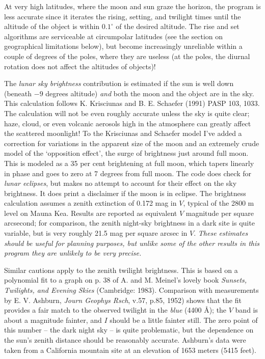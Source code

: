 At very high latitudes, where the moon and sun graze the horizon, the 
program is less accurate since it iterates the rising, setting, and twilight 
times until the altitude of the object is within $0.1^{\circ}$ of the 
desired altitude. The rise and set algorithms are serviceable at circumpolar 
latitudes (see the section on geographical limitations below), but become
increasingly unreliable within a couple of degrees of the poles, where they 
are useless (at the poles, the diurnal rotation does not affect the altitudes 
of objects)!

The {\it lunar sky brightness} contribution is estimated if the sun is well 
down (beneath $-9$ degrees altitude) {\it and} both the moon and the object 
are in the sky.  This calculation follows K. Krisciunas and B. E. Schaefer 
(1991) PASP 103, 1033.  The calculation will not be even roughly accurate 
unless the sky is quite clear; haze, cloud, or even volcanic aerosols high
in the atmosphere can greatly affect the scattered moonlight!  To the 
Krisciunas and Schaefer model I've added a correction for variations in the 
apparent size of the moon and an extremely crude model of the `opposition 
effect', the surge of brightness just around full moon. This is modeled as a 
35 per cent brightening at full moon, which tapers linearly in phase and 
goes to zero at 7 degrees from full moon.  The code does check for 
{\it lunar eclipses}, but makes no attempt to account for their effect on 
the sky brightness.  It does print a disclaimer if the moon is in eclipse.
The brightness calculation assumes a zenith extinction of 0.172 mag in $V$,
typical of the 2800 m level on Mauna Kea.  Results are reported
as equivalent $V$ magnitude per square arcsecond; for comparison, 
the zenith night-sky brightness in a dark site is quite variable, but
is very roughly 21.5 mag per square arcsec in $V$.  
{\it These estimates should be useful for planning purposes, but unlike some 
of the other results in this program they are unlikely to be very precise.}

Similar cautions apply to the zenith twilight brightness.  This is
based on a polynomial fit to a graph on p. 38 of A. and M. Meinel's lovely 
book {\it Sunsets, Twilights, and Evening Skies} (Cambridge: 1983).  
Comparison with measurements by E. V. Ashburn, {\it Journ Geophys
Rsch}, v.57, p.85, 1952) shows that the fit provides a fair match
to the observed twilight in the {\it blue} (4400 \AA ); the $V$
band is about a magnitude fainter, and $I$ should be a little fainter
still.  The zero point of this number -- the dark night sky -- is 
quite problematic, but the dependence on the sun's zenith distance 
should be reasonably accurate.  Ashburn's data were taken from a 
California mountain site at an elevation of 1653 meters (5415 feet).  
 
